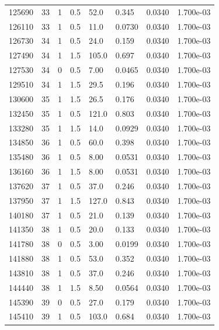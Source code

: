\documentclass[preview]{standalone}
\begin{document}
{{{{{\begin{tabular}{L{1.2cm}C{1.2cm} C{0.3cm}C{0.5cm} C{1.4cm}C{1.4cm} C{1.4cm}C{1.4cm}}
  125690  &    33  & 1     & 0.5 &  52.0  & 0.345  & 0.0340 &  1.700e-03   \\ 
  126110  &    33  & 1     & 0.5 &  11.0  & 0.0730  & 0.0340 &  1.700e-03   \\ 
  126730  &    34  & 1     & 0.5 &  24.0  & 0.159  & 0.0340 &  1.700e-03   \\ 
  127490  &    34  & 1     & 1.5 &  105.0  & 0.697  & 0.0340 &  1.700e-03   \\ 
  127530  &    34  & 0     & 0.5 &  7.00  & 0.0465  & 0.0340 &  1.700e-03   \\ 
  129510  &    34  & 1     & 1.5 &  29.5  & 0.196  & 0.0340 &  1.700e-03   \\ 
  130600  &    35  & 1     & 1.5 &  26.5  & 0.176  & 0.0340 &  1.700e-03   \\ 
  132450  &    35  & 1     & 0.5 &  121.0  & 0.803  & 0.0340 &  1.700e-03   \\ 
  133280  &    35  & 1     & 1.5 &  14.0  & 0.0929  & 0.0340 &  1.700e-03   \\ 
  134850  &    36  & 1     & 0.5 &  60.0  & 0.398  & 0.0340 &  1.700e-03   \\ 
  135480  &    36  & 1     & 0.5 &  8.00  & 0.0531  & 0.0340 &  1.700e-03   \\ 
  136160  &    36  & 1     & 1.5 &  8.00  & 0.0531  & 0.0340 &  1.700e-03   \\ 
  137620  &    37  & 1     & 0.5 &  37.0  & 0.246  & 0.0340 &  1.700e-03   \\ 
  137950  &    37  & 1     & 1.5 &  127.0  & 0.843  & 0.0340 &  1.700e-03   \\ 
  140180  &    37  & 1     & 0.5 &  21.0  & 0.139  & 0.0340 &  1.700e-03   \\ 
  141350  &    38  & 1     & 0.5 &  20.0  & 0.133  & 0.0340 &  1.700e-03   \\ 
  141780  &    38  & 0     & 0.5 &  3.00  & 0.0199  & 0.0340 &  1.700e-03   \\ 
  141880  &    38  & 1     & 0.5 &  53.0  & 0.352  & 0.0340 &  1.700e-03   \\ 
  143810  &    38  & 1     & 0.5 &  37.0  & 0.246  & 0.0340 &  1.700e-03   \\ 
  144440  &    38  & 1     & 1.5 &  8.50  & 0.0564  & 0.0340 &  1.700e-03   \\ 
  145390  &    39  & 0     & 0.5 &  27.0  & 0.179  & 0.0340 &  1.700e-03   \\ 
  145410  &    39  & 1     & 0.5 &  103.0  & 0.684  & 0.0340 &  1.700e-03   \\ 

\end{tabular}}}}}}
\end{document}
